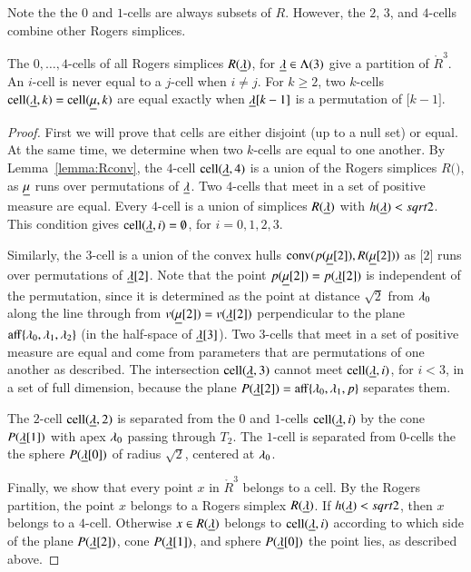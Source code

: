 Note the the $0$ and $1$-cells are always subsets of $R$.  However, the $2$, $3$, and
$4$-cells combine other Rogers simplices.

\begin{lemma}  The $0,\ldots,4$-cells of all Rogers simplices $R({\underline{\lambda}})$, for ${\underline{\lambda}}\in \Lambda(3)$
give a partition of $\ring{R}^3$.  An $i$-cell is never equal to a $j$-cell when $i\ne j$. For $k\ge 2$, 
two $k$-cells $\operatorname{cell}({\underline{\lambda}},k)=\operatorname{cell}({\underline{\mu}},k)$ are equal exactly when ${\underline{\lambda}}[k-1]$
is a permutation of $\bm[k-1]$.
\end{lemma}

\begin{proof}  First we will prove that cells are either disjoint (up to a null set) or equal.  At the same time, we determine when two $k$-cells are equal to one another. By Lemma~\ref{lemma:Rconv}, the $4$-cell $\operatorname{cell}({\underline{\lambda}},4)$ is a union of the Rogers simplices $R(\bm)$, as ${\underline{\mu}}$ runs over permutations of ${\underline{\lambda}}$.   Two $4$-cells that meet in a set of positive measure are equal.  Every $4$-cell is a union of simplices $R({\underline{\lambda}})$ with $h({\underline{\lambda}})<sqrt2$.  This condition gives $\operatorname{cell}({\underline{\lambda}},i)=\emptyset$, for $i=0,1,2,3$.

Similarly, the $3$-cell is a union
of the convex hulls ${\operatorname{conv}}(p({\underline{\mu}}[2]),R({\underline{\mu}}[2]))$ as $\bm[2]$ runs over permutations of ${\underline{\lambda}}[2]$.  Note that the point $p({\underline{\mu}}[2])=p({\underline{\lambda}}[2])$ is independent of the permutation, since
it is determined as the point at distance $\sqrt2$ from $\lambda_0$ along the line through
from $v({\underline{\mu}}[2])=v({\underline{\lambda}}[2])$ perpendicular to the plane ${\operatorname{aff}}\{\lambda_0,\lambda_1,\lambda_2\}$
(in the half-space of ${\underline{\lambda}}[3]$). Two $3$-cells that meet in a set of positive measure are equal and come from parameters that are permutations of  one another as described.   The intersection $\operatorname{cell}({\underline{\lambda}},3)$ cannot meet $\operatorname{cell}({\underline{\lambda}},i)$, for $i<3$, in a set of full dimension, because the plane $P({\underline{\lambda}}[2])={\operatorname{aff}}\{\lambda_0,\lambda_1,p\}$ separates them.

The $2$-cell $\operatorname{cell}({\underline{\lambda}},2)$ is separated from the $0$ and $1$-cells $\operatorname{cell}({\underline{\lambda}},i)$
by the cone $P({\underline{\lambda}}[1])$ with apex $\lambda_0$
passing through $T_2$. The $1$-cell is separated from $0$-cells the the sphere $P({\underline{\lambda}}[0])$
of radius
$\sqrt2$, centered at $\lambda_0$.

Finally, we show that every point $x$ in $\ring{R}^3$ belongs to a cell.  By the Rogers
partition, the point $x$ belongs to a Rogers simplex $R({\underline{\lambda}})$.  If $h({\underline{\lambda}})<sqrt2$, then
$x$ belongs to a $4$-cell.  Otherwise $x\in R({\underline{\lambda}})$ belongs to $\operatorname{cell}({\underline{\lambda}},i)$ according to
which side of the plane $P({\underline{\lambda}}[2])$, cone $P({\underline{\lambda}}[1])$, and sphere $P({\underline{\lambda}}[0])$ the point
lies, as described above.
\end{proof}


